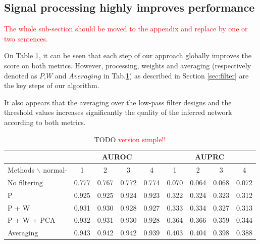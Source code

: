 \documentclass[wcp]{jmlr}
\begin{document}
\subsection*{Signal processing highly improves performance}

\textcolor{red}{The whole sub-section should be moved to the appendix and
                replace by one or two sentences.}

On Table \ref{tab:tab3}, it can be seen that each step of our approach globally
improves the score on both metrics. However, processing, weights and averaging
(respectively denoted as $P$,$W$ and $Averaging$ in Tab.\ref{tab:tab3}) as
described in Section \ref{sec:filter} are the key steps of our algorithm.

It also appears that the averaging over the low-pass filter designs and the
threshold values increases significantly the quality of the inferred network
according to both metrics.



\begin{table}[tbh]
\centering
\small
\begin{tabular}{@{}l *{8}{c}@{}}
\hline
  & \multicolumn{4}{c}{AUROC} & \multicolumn{4}{c}{AUPRC} \\
\hline
Methods $\backslash$ normal- & 1 & 2 & 3 & 4 & 1 & 2 & 3 & 4 \\
No  filtering       & 0.777 & 0.767 & 0.772 & 0.774 & 0.070 & 0.064 & 0.068 & 0.072\\
P                   & 0.925 & 0.925 & 0.924 & 0.923 & 0.322 & 0.324 & 0.323 & 0.312\\
P + W               & 0.931 & 0.930 & 0.928 & 0.927 & 0.333 & 0.334 & 0.327 & 0.313\\
P + W + PCA         & 0.932 & 0.931 & 0.930 & 0.928 & 0.364 & 0.366 & 0.359 & 0.344\\
Averaging           & 0.943 & 0.942 & 0.942 & 0.939 & 0.403 & 0.404 & 0.398 & 0.388\\
\end{tabular}
\caption{TODO \textcolor{red}{version simple!!}}
\label{tab:tab3}
\end{table}
\end{document}
